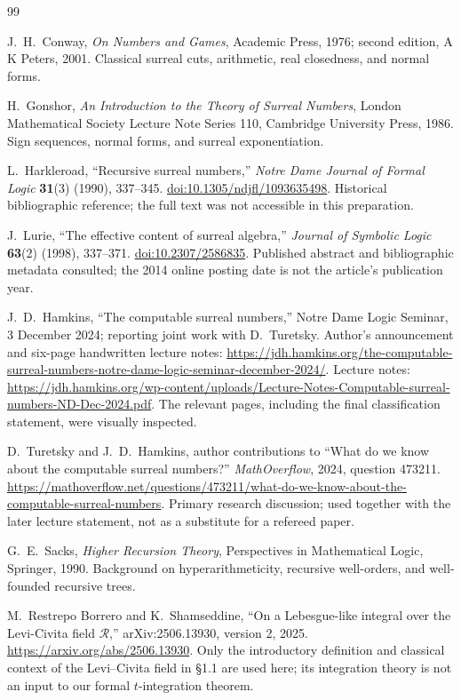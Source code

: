 \documentclass[11pt,letterpaper]{article}
\numberwithin{equation}{section}
\theoremstyle{definition}
\theoremstyle{remark}
\begin{document}
\begin{thebibliography}{99}
\raggedright

J.~H.~Conway, \emph{On Numbers and Games}, Academic Press, 1976;
second edition, A K Peters, 2001. Classical surreal cuts, arithmetic,
real closedness, and normal forms.

H.~Gonshor, \emph{An Introduction to the Theory of Surreal Numbers},
London Mathematical Society Lecture Note Series 110, Cambridge University
Press, 1986. Sign sequences, normal forms, and surreal exponentiation.

L.~Harkleroad, ``Recursive surreal numbers,'' \emph{Notre Dame Journal of
Formal Logic} \textbf{31}(3) (1990), 337--345.
\href{https://doi.org/10.1305/ndjfl/1093635498}{doi:10.1305/ndjfl/1093635498}.
Historical bibliographic reference; the full text was not accessible in
this preparation.

J.~Lurie, ``The effective content of surreal algebra,'' \emph{Journal of
Symbolic Logic} \textbf{63}(2) (1998), 337--371.
\href{https://doi.org/10.2307/2586835}{doi:10.2307/2586835}.
Published abstract and bibliographic metadata consulted; the 2014 online
posting date is not the article's publication year.

J.~D.~Hamkins, ``The computable surreal numbers,'' Notre Dame Logic
Seminar, 3 December 2024; reporting joint work with D.~Turetsky.
Author's announcement and six-page handwritten lecture notes:
\url{https://jdh.hamkins.org/the-computable-surreal-numbers-notre-dame-logic-seminar-december-2024/}.
Lecture notes:
\url{https://jdh.hamkins.org/wp-content/uploads/Lecture-Notes-Computable-surreal-numbers-ND-Dec-2024.pdf}.
The relevant pages, including the final classification statement, were
visually inspected.

D.~Turetsky and J.~D.~Hamkins, author contributions to ``What do we know
about the computable surreal numbers?'' \emph{MathOverflow}, 2024,
question 473211.
\url{https://mathoverflow.net/questions/473211/what-do-we-know-about-the-computable-surreal-numbers}.
Primary research discussion; used together with the later lecture
statement, not as a substitute for a refereed paper.

G.~E.~Sacks, \emph{Higher Recursion Theory}, Perspectives in Mathematical
Logic, Springer, 1990. Background on hyperarithmeticity, recursive
well-orders, and well-founded recursive trees.

M.~Restrepo Borrero and K.~Shamseddine, ``On a Lebesgue-like integral over
the Levi-Civita field $\mathcal R$,'' arXiv:2506.13930, version 2, 2025.
\url{https://arxiv.org/abs/2506.13930}.
Only the introductory definition and classical context of the
Levi--Civita field in \S1.1 are used here; its integration theory is not
an input to our formal $t$-integration theorem.


\end{thebibliography}
\end{document}
